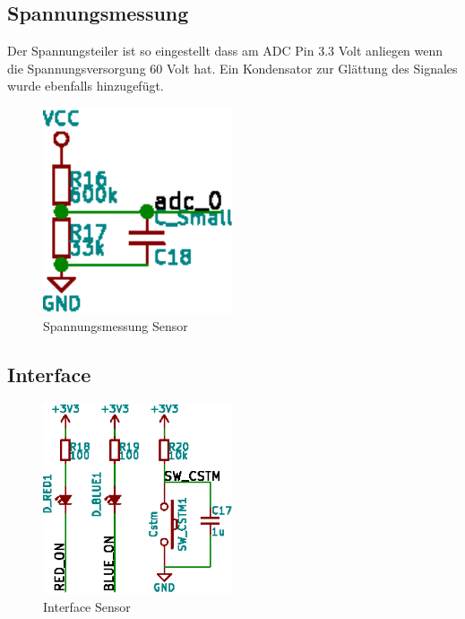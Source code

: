 
\subsection{Spannungsmessung}
\label{subsec:hw:sensor:voltageSense}

Der Spannungsteiler ist so eingestellt dass am ADC Pin 3.3 Volt anliegen wenn die Spannungsversorgung 60 Volt hat.
Ein Kondensator zur Glättung des Signales wurde ebenfalls hinzugefügt.

\begin{figure}[h!t]
    \centering
    \includegraphics[width=0.5\textwidth]{images/sensor-sch/sensor--sch--sensor.eps}
    \caption[Sensor: Schema Spannungsmessung]{Spannungsmessung Sensor}
\end{figure}


\subsection{Interface}
\label{subsec:hw:sensor:interface}

\begin{figure}[h!t]
    \centering
    \includegraphics[width=0.5\textwidth]{images/sensor-sch/sensor--sch--interface.eps}
    \caption[Sensor: Schema Interface]{Interface Sensor}
\end{figure}

